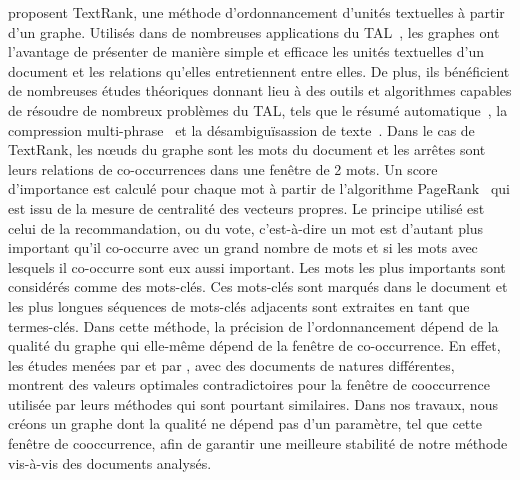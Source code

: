      proposent TextRank, une méthode
    d'ordonnancement d'unités textuelles à partir d'un graphe. Utilisés dans de
    nombreuses applications du TAL~\cite{kozareva2013textgraphs}, les graphes
    ont l'avantage de présenter de manière simple et efficace les unités
    textuelles d'un document et les relations qu'elles entretiennent entre
    elles. De plus, ils bénéficient de nombreuses études théoriques donnant lieu
    à des outils et algorithmes capables de résoudre de nombreux problèmes du
    TAL, tels que le résumé automatique~\cite{wan2007iterativereinforcement}, la
    compression multi-phrase~\cite{boudin2013multisentencecompression} et la
    désambiguïsassion de texte~\cite{schwab2013desambiguisation}. Dans le cas de
    TextRank, les n\oe{}uds du graphe sont les mots du document et les arrêtes
    sont leurs relations de co-occurrences dans une fenêtre de 2 mots. Un score
    d'importance est calculé pour chaque mot à partir de l'algorithme 
    PageRank~\cite{brin1998pagerank} qui est issu de la mesure de centralité des
    vecteurs propres. Le principe utilisé est celui de la recommandation, ou du
    vote, c'est-à-dire un mot est d'autant plus important qu'il co-occurre avec
    un grand nombre de mots et si les mots avec lesquels il co-occurre sont eux
    aussi important. Les mots les plus importants sont considérés comme des
    mots-clés. Ces mots-clés sont marqués dans le document et les plus longues
    séquences de mots-clés adjacents sont extraites en tant que termes-clés.
    Dans cette méthode, la précision de l'ordonnancement dépend de la qualité du
    graphe qui elle-même dépend de la fenêtre de co-occurrence. En effet, les
    études menées par  et par
    , avec des documents de natures différentes,
    montrent des valeurs optimales contradictoires pour la fenêtre de
    cooccurrence utilisée par leurs méthodes qui sont pourtant similaires. Dans
    nos travaux, nous créons un graphe dont la qualité ne dépend pas d'un
    paramètre, tel que cette fenêtre de cooccurrence, afin de garantir une
    meilleure stabilité de notre méthode vis-à-vis des documents analysés.

